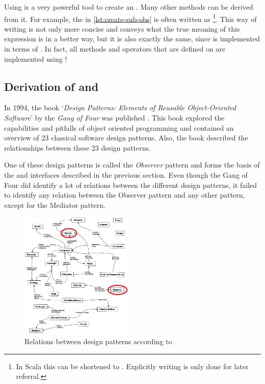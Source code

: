 Using  is a very powerful tool to create an \obs. Many other methods can be derived from it. For example, the \obs in \autoref{lst:create-sub-obs} is often written as \footnote{In Scala this can be shortened to . Explicitly writing  is only done for later referral.}. This way of writing is not only more concise and conveys what the true meaning of this expression is in a better way, but it is also exactly the same, since  is implemented in terms of . In fact, all methods and operators that are defined on \obs are implemented using !

\subsection{Derivation of \obs and \obv}
\label{subsec:derivation}
In 1994, the book `\textit{Design Patterns: Elements of Reusable Object-Oriented Software}' by the \textit{Gang of Four} was published \cite{gamma1994-DesignPatternsGOF}. This book explored the capabilities and pitfalls of object oriented programming and contained an overview of 23 classical software design patterns. Also, the book described the relationships between these 23 design patterns.

One of these design patterns is called the \textit{Observer} pattern and forms the basis of the \obs and \obv interfaces described in the previous section. Even though the Gang of Four did identify a lot of relations between the different design patterns, it failed to identify any relation between the Observer pattern and any other pattern, except for the Mediator pattern.

\begin{figure}[H]
	\begin{center}
		\includegraphics[width=0.48\textwidth]{figures/DesignPatternRelationships_bew.png}
	\end{center}
	\caption{Relations between design patterns according to \cite{gamma1994-DesignPatternsGOF}}
	\label{fig:designPatternRelationships}
\end{figure}

